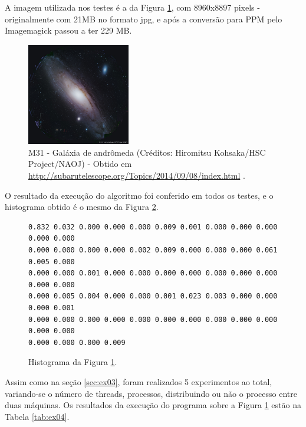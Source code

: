 \documentclass[conference]{IEEEtran}
\begin{document}
A imagem utilizada nos testes é a da Figura \ref{fig:ex04_1}, com  8960x8897 pixels - originalmente com 21MB no formato jpg, e após a conversão para PPM pelo Imagemagick passou a ter 229 MB.


\begin{figure}[!htb]
  \centering
\includegraphics[width=0.4\textwidth] {small-image.jpg}
\caption{M31 - Galáxia de andrômeda (Créditos: Hiromitsu Kohsaka/HSC Project/NAOJ) - Obtido em \url{http://subarutelescope.org/Topics/2014/09/08/index.html} .}
\label{fig:ex04_1}
\end{figure}

 O resultado da execução do algoritmo foi conferido em todos os testes, e o histograma obtido é o mesmo da Figura \ref{fig:ex04_2}.

\begin{figure}[!htb]
  \begin{adjustbox}{max width=\linewidth}
	\begin{BVerbatim}
0.832 0.032 0.000 0.000 0.000 0.009 0.001 0.000 0.000 0.000 0.000 0.000
0.000 0.000 0.000 0.000 0.002 0.009 0.000 0.000 0.000 0.061 0.005 0.000
0.000 0.000 0.001 0.000 0.000 0.000 0.000 0.000 0.000 0.000 0.000 0.000
0.000 0.005 0.004 0.000 0.000 0.001 0.023 0.003 0.000 0.000 0.000 0.001
0.000 0.000 0.000 0.000 0.000 0.000 0.000 0.000 0.000 0.000 0.000 0.000
0.000 0.000 0.000 0.009
  \end{BVerbatim}
  \end{adjustbox}
\caption{Histograma da Figura \ref{fig:ex04_1}.}
\label{fig:ex04_2}
\end{figure}


Assim como na seção \ref{sec:ex03}, foram realizados 5 experimentos ao total, variando-se o número de threads, processos, distribuindo ou não o processo entre duas máquinas. Os resultados da execução do programa sobre a Figura \ref{fig:ex04_1} estão na Tabela \ref{tab:ex04}.
\end{document}
